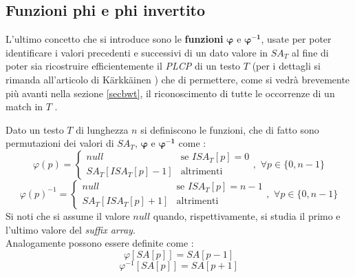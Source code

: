 \subsection{Funzioni phi e phi invertito}
L'ultimo concetto che si introduce sono le \textbf{funzioni}
$\boldsymbol\varphi$ e $\mathbf{\boldsymbol\varphi^{-1}}$, usate per poter
identificare i valori precedenti e successivi di 
un dato valore in $SA_T$ al fine di poter sia ricostruire efficientemente il
\textit{PLCP} di un testo $T$ (per i dettagli si rimanda all'articolo di
K\"{a}rkk\"{a}inen \cite{plcp}) che di permettere, come si vedrà brevemente più 
avanti nella sezione \ref{secbwt}, il riconoscimento di tutte le occorrenze di
un match in $T$ \cite{phoni}.
\begin{definizione}
  Dato un testo $T$ di lunghezza $n$ si definiscono le funzioni, che di fatto
  sono permutazioni dei valori di $SA_T$, $\boldsymbol\varphi$ e
  $\mathbf{\boldsymbol\varphi^{-1}}$ come \cite{phoni}: 
  \[\varphi(p)=
    \begin{cases}
      null&\mbox{se } ISA_T[p]=0\\
      SA_T[ISA_T[p]-1]&\mbox{altrimenti}
    \end{cases},\,\,\forall p\in\{0,n-1\}
  \]
   \[\varphi(p)^{-1}=
    \begin{cases}
      null&\mbox{se } ISA_T[p]=n-1\\
      SA_T[ISA_T[p]+1]&\mbox{altrimenti}
    \end{cases},\,\,\forall p\in\{0,n-1\}
  \]
  Si noti che si assume il valore $null$ quando, rispettivamente, si studia il
  primo e l'ultimo valore del \textit{suffix array}.\\
  Analogamente possono essere definite come \cite{plcp}:
  \[\varphi[SA[p]]=SA[p-1]\]
  \[\varphi^{-1}[SA[p]]=SA[p+1]\]
\end{definizione}
